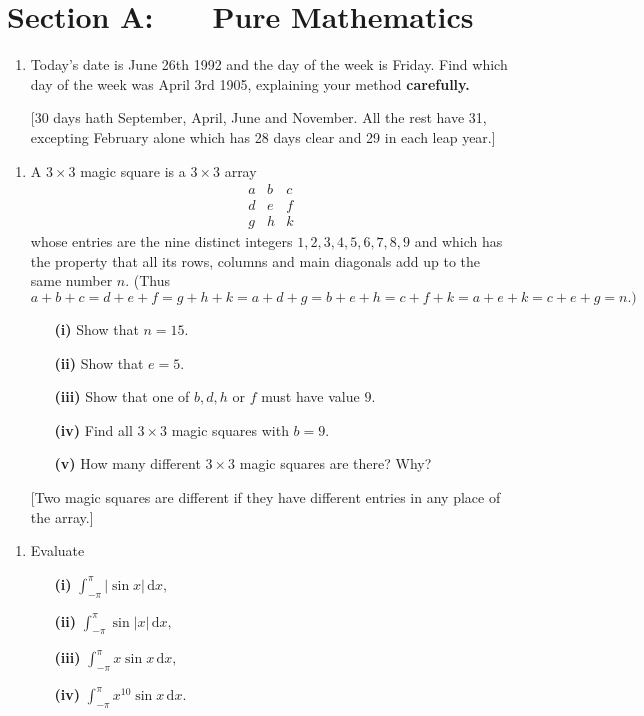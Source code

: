 \documentclass[a4, 11pt]{report}
\newlength{\qspace}
\newcounter{qnumber}
\newenvironment{question}%
 {\vspace{\qspace}
  \begin{enumerate}[\bfseries 1\quad][10]%
    \setcounter{enumi}{\value{qnumber}}%
    \item%
 }
{
  \end{enumerate}
  \filbreak
  \stepcounter{qnumber}
 }
\begin{document}
\setcounter{page}{2}

 
\section*{Section A: \ \ \ Pure Mathematics}

\begin{question}
Today's date is June 26th 1992 and the day of the week is Friday.
Find which day of the week was April 3rd 1905, explaining your method
\textbf{carefully. }


{[}30 days hath September, April, June and November. All the rest
have 31, excepting February alone which has 28 days clear and 29 in
each leap year.{]}
\end{question}

\begin{question}
A $3\times3$ magic square is a $3\times3$ array 
\[
\begin{array}{ccc}
a & b & c\\
d & e & f\\
g & h & k
\end{array}
\]
whose entries are the nine distinct integers $1,2,3,4,5,6,7,8,9$
and which has the property that all its rows, columns and main diagonals
add up to the same number $n$. (Thus $a+b+c=d+e+f=g+h+k=a+d+g=b+e+h=c+f+k=a+e+k=c+e+g=n.)$
\begin{itemize}
\setlength{\itemsep}{3mm}
\item[\bf (i)]  Show that $n=15.$
\item[\bf (ii)] Show that $e=5.$
\item[\bf (iii)] Show that one of $b,d,h$ or $f$ must have value $9$. 
\item[\bf (iv)] Find all $3\times3$ magic squares with $b=9.$
\item[\bf (v)] How many different $3\times3$ magic squares are there? Why?
\end{itemize}
{[}Two magic squares are different if they have different entries
in any place of the array.{]} 
\end{question}

\begin{question}
Evaluate 
\begin{itemize}
\setlength{\itemsep}{3mm}
\item[\bf (i)]  ${\displaystyle \int_{-\pi}^{\pi}\left|\sin x\right|\,\mathrm{d}x,}$
\item[\bf (ii)] ${\displaystyle \int_{-\pi}^{\pi}\sin\left|x\right|\,\mathrm{d}x},$ 
\item[\bf (iii)] ${\displaystyle \int_{-\pi}^{\pi}x\sin x\,\mathrm{d}x},$ 
\item[\bf (iv)] ${\displaystyle \int_{-\pi}^{\pi}x^{10}\sin x\,\mathrm{d}x.}$
\end{itemize}
\end{question}
\end{document}
